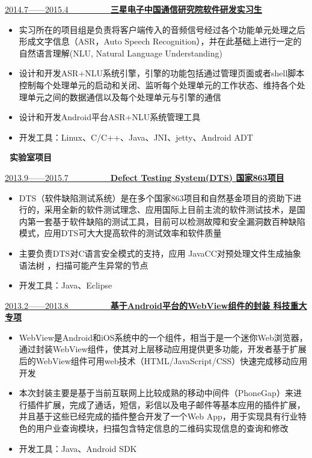 \documentclass[a4paper,oneside,UTF8, winfonts]{ctexart}
\begin{document}
\uline{2014.7——2015.4~~~~~~~~~~\bf{三星电子中国通信研究院}\hfill \bf{软件研发实习生}}
\begin{itemize}[topsep=0.3em, leftmargin=3pc]
  \setlength{\itemsep}{0pt}
  \setlength{\parsep}{4pt}
  \setlength{\parskip}{4pt}
  \item {}实习所在的项目组是负责将客户端传入的音频信号经过各个功能单元处理之后形成文字信息（ASR，Auto Speech Recognition），并在此基础上进行一定的自然语言理解(NLU, Natural Language Understanding)
  \item {}设计和开发ASR+NLU系统引擎，引擎的功能包括通过管理页面或者shell脚本控制每个处理单元的启动和关闭、监听每个处理单元的工作状态、维持各个处理单元之间的数据通信以及每个处理单元与引擎的通信
  \item {}设计和开发Android平台ASR+NLU系统管理工具
  \item {}开发工具：Linux、C/C++、Java、JNI、jetty、Android ADT
\end{itemize}
\noindent \textbf{ \heiti \faUniversity\ 实验室项目}\par
\vspace{1.2ex}
\uline{2013.9——2015.7~~~~~~~~~~\bf{Defect Testing System(DTS)} \hfill \bf{国家863项目}}
\begin{itemize}[topsep=0.3em, leftmargin=3pc]
  \setlength{\itemsep}{0pt}
  \setlength{\parsep}{4pt}
  \setlength{\parskip}{4pt}
  \item {}DTS（软件缺陷测试系统）是在多个国家863项目和自然基金项目的资助下进行的，采用全新的软件测试理念、应用国际上目前主流的软件测试技术，是国内第一套基于软件缺陷的测试工具，目前可以检测故障和安全漏洞数百种缺陷模式，应用DTS可大大提高软件的测试效率和软件质量
  \item {}主要负责DTS对C语言安全模式的支持，应用 JavaCC对预处理文件生成抽象语法树 ，扫描可能产生异常的节点
  \item {}开发工具：Java、Eclipse
\end{itemize}\par
\uline{2013.2——2013.8~~~~~~~~~~\bf{基于Android平台的WebView组件的封装} \hfill \bf{科技重大专项}}
\begin{itemize}[topsep=0.3em, leftmargin=3pc]
  \setlength{\itemsep}{0pt}
  \setlength{\parsep}{4pt}
  \setlength{\parskip}{4pt}
  \item {}WebView是Android和iOS系统中的一个组件，相当于是一个迷你Web浏览器，通过封装WebView组件，使其对上层移动应用提供更多功能，开发者基于扩展后的WebView组件可用web技术（HTML/JavaScript/CSS）快速完成移动应用开发
  \item {}本次封装主要是基于当前互联网上比较成熟的移动中间件（PhoneGap）来进行插件扩展，完成了通话，短信，彩信以及电子邮件等基本应用的插件扩展，并且基于这些已经完成的插件整合开发了一个Web App，用于实现具有行业特色的用户业查询模块，扫描包含特定信息的二维码实现信息的查询和修改
  \item {}开发工具：Java、Android SDK
\end{itemize}
\end{document}
